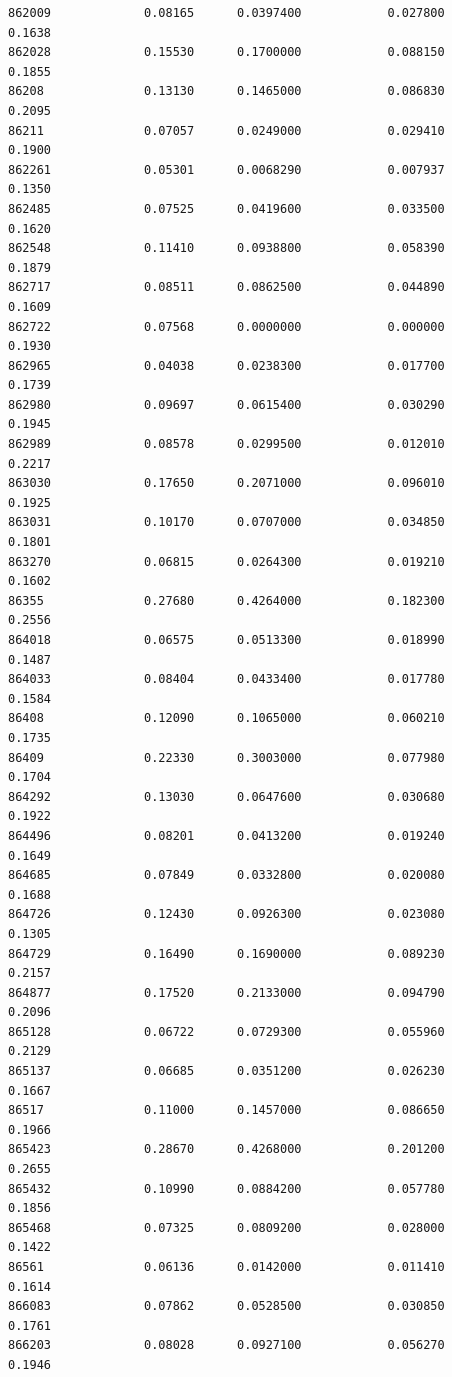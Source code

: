 \documentclass[
  letterpaper,
  DIV=11,
  numbers=noendperiod]{scrartcl}
\begin{document}
\begin{verbatim}
862009             0.08165      0.0397400            0.027800        0.1638
862028             0.15530      0.1700000            0.088150        0.1855
86208              0.13130      0.1465000            0.086830        0.2095
86211              0.07057      0.0249000            0.029410        0.1900
862261             0.05301      0.0068290            0.007937        0.1350
862485             0.07525      0.0419600            0.033500        0.1620
862548             0.11410      0.0938800            0.058390        0.1879
862717             0.08511      0.0862500            0.044890        0.1609
862722             0.07568      0.0000000            0.000000        0.1930
862965             0.04038      0.0238300            0.017700        0.1739
862980             0.09697      0.0615400            0.030290        0.1945
862989             0.08578      0.0299500            0.012010        0.2217
863030             0.17650      0.2071000            0.096010        0.1925
863031             0.10170      0.0707000            0.034850        0.1801
863270             0.06815      0.0264300            0.019210        0.1602
86355              0.27680      0.4264000            0.182300        0.2556
864018             0.06575      0.0513300            0.018990        0.1487
864033             0.08404      0.0433400            0.017780        0.1584
86408              0.12090      0.1065000            0.060210        0.1735
86409              0.22330      0.3003000            0.077980        0.1704
864292             0.13030      0.0647600            0.030680        0.1922
864496             0.08201      0.0413200            0.019240        0.1649
864685             0.07849      0.0332800            0.020080        0.1688
864726             0.12430      0.0926300            0.023080        0.1305
864729             0.16490      0.1690000            0.089230        0.2157
864877             0.17520      0.2133000            0.094790        0.2096
865128             0.06722      0.0729300            0.055960        0.2129
865137             0.06685      0.0351200            0.026230        0.1667
86517              0.11000      0.1457000            0.086650        0.1966
865423             0.28670      0.4268000            0.201200        0.2655
865432             0.10990      0.0884200            0.057780        0.1856
865468             0.07325      0.0809200            0.028000        0.1422
86561              0.06136      0.0142000            0.011410        0.1614
866083             0.07862      0.0528500            0.030850        0.1761
866203             0.08028      0.0927100            0.056270        0.1946

\end{verbatim}
\end{document}
